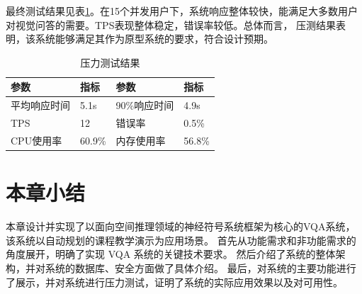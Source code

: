 最终测试结果见表\ref{tab:test_result}。在15个并发用户下，系统响应整体较快，能满足大多数用户对视觉问答的需要。TPS表现整体稳定，错误率较低。总体而言，
压测结果表明，该系统能够满足其作为原型系统的要求，符合设计预期。
\begin{table}[h]
    \centering
    \renewcommand{\arraystretch}{1.3} %
    \begin{tabular}{|l|l|l|l|}
        \hline
        \textbf{参数} & \textbf{指标} & \textbf{参数} & \textbf{指标} \\
        \hline
        平均响应时间 & 5.1s & 90\%响应时间 & 4.9s \\
        \hline
        TPS & 12 & 错误率 & 0.5\% \\
        \hline
        CPU使用率 & 60.9\% & 内存使用率 & 56.8\% \\
        \hline
    \end{tabular}
    \caption{压力测试结果}
    \label{tab:test_result}
\end{table}
\section{本章小结}
本章设计并实现了以面向空间推理领域的神经符号系统框架为核心的VQA系统，该系统以自动规划的课程教学演示为应用场景。
首先从功能需求和非功能需求的角度展开，明确了实现 VQA 系统的关键技术要求。
然后介绍了系统的整体架构，并对系统的数据库、安全方面做了具体介绍。
最后，对系统的主要功能进行了展示，并对系统进行压力测试，证明了系统的实际应用效果以及对可用性。